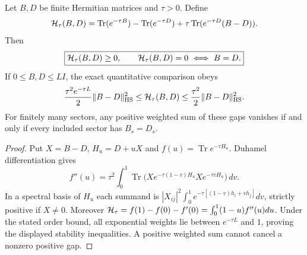 \documentclass[12pt,a4paper]{article}
\begin{document}
\begin{theorem}
\label{p2a:thm:v267-heat-bregman-converse}
Let $B,D$ be finite Hermitian matrices and $\tau>0$.  Define
\begin{equation}\label{p2a:eq:v267-heat-bregman}
 {\cal H}_\tau(B,D)=\operatorname{Tr}(e^{-\tau B})
 -\operatorname{Tr}(e^{-\tau D})
 +\tau\operatorname{Tr}(e^{-\tau D}(B-D)).
\end{equation}
Then
\[
 \boxed{{\cal H}_\tau(B,D)\geq0,\qquad
 {\cal H}_\tau(B,D)=0\ \Longleftrightarrow\ B=D.}
\]
If $0\leq B,D\leq LI$, the exact quantitative comparison obeys
\[
 \frac{\tau^2e^{-\tau L}}2\|B-D\|_{\mathrm{HS}}^2
 \leq{\cal H}_\tau(B,D)
 \leq\frac{\tau^2}2\|B-D\|_{\mathrm{HS}}^2.
\]
For finitely many sectors, any positive weighted sum of these gaps
vanishes if and only if every included sector has $B_s=D_s$.
\end{theorem}
\begin{proof}
Put $X=B-D$, $H_u=D+uX$ and $f(u)=\operatorname{Tr}e^{-\tau H_u}$.
Duhamel differentiation gives
\[
 f''(u)=\tau^2\int_0^1\!\operatorname{Tr}
 \bigl(Xe^{-\tau(1-v)H_u}Xe^{-\tau vH_u}\bigr)\,dv.
\]
In a spectral basis of $H_u$ each summand is
$|X_{ij}|^2\int_0^1e^{-\tau[(1-v)h_i+vh_j]}dv$,
strictly positive if $X\neq0$.  Moreover
${\cal H}_\tau=f(1)-f(0)-f'(0)=\int_0^1(1-u)f''(u)du$.
Under the stated order bound, all exponential weights lie between
$e^{-\tau L}$ and $1$, proving the displayed stability inequalities.
A positive weighted sum cannot cancel a nonzero positive gap.
\end{proof}
\end{document}

